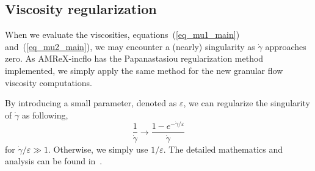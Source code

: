 
\subsection{Viscosity regularization}
When we evaluate the viscosities, equations~(\ref{eq_mu1_main}) and~(\ref{eq_mu2_main}), we may encounter a (nearly) singularity as $\dot{\gamma}$ approaches zero.
As AMReX-incflo has the Papanastasiou regularization method implemented, we simply apply the same method for the new granular flow viscosity computations.
\par
By introducing a small parameter, denoted as $\varepsilon$, we can regularize the singularity of $\dot{\gamma}$ as following,
\[
  \frac{1}{\dot{\gamma}} \rightarrow \frac{1-e^{-\dot{\gamma} / \varepsilon}}{\dot{\gamma}}  
\]
for $\dot{\gamma}/\varepsilon \gg 1$. Otherwise, we simply use $1/\varepsilon$. 
The detailed mathematics and analysis can be found in~\cite{sverdrup_highly_2018}.
